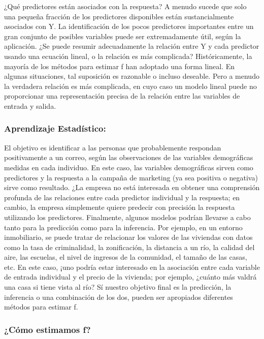 \documentclass[
  letterpaper,
  DIV=11,
  numbers=noendperiod]{scrartcl}
\begin{document}
¿Qué predictores están asociados con la respuesta? A menudo sucede que
solo una pequeña fracción de los predictores disponibles están
sustancialmente asociados con Y. La identificación de los pocos
predictores importantes entre un gran conjunto de posibles variables
puede ser extremadamente útil, según la aplicación. ¿Se puede resumir
adecuadamente la relación entre Y y cada predictor usando una ecuación
lineal, o la relación es más complicada? Históricamente, la mayoría de
los métodos para estimar f han adoptado una forma lineal. En algunas
situaciones, tal suposición es razonable o incluso deseable. Pero a
menudo la verdadera relación es más complicada, en cuyo caso un modelo
lineal puede no proporcionar una representación precisa de la relación
entre las variables de entrada y salida.

\hypertarget{aprendizaje-estaduxedstico}{%
\subsubsection{\texorpdfstring{\textbf{Aprendizaje
Estadístico:}}{Aprendizaje Estadístico:}}\label{aprendizaje-estaduxedstico}}

El objetivo es identificar a las personas que probablemente respondan
positivamente a un correo, según las observaciones de las variables
demográficas medidas en cada individuo. En este caso, las variables
demográficas sirven como predictores y la respuesta a la campaña de
marketing (ya sea positiva o negativa) sirve como resultado. ¿La empresa
no está interesada en obtener una comprensión profunda de las relaciones
entre cada predictor individual y la respuesta; en cambio, la empresa
simplemente quiere predecir con precisión la respuesta utilizando los
predictores. Finalmente, algunos modelos podrían llevarse a cabo tanto
para la predicción como para la inferencia. Por ejemplo, en un entorno
inmobiliario, se puede tratar de relacionar los valores de las viviendas
con datos como la tasa de criminalidad, la zonificación, la distancia a
un río, la calidad del aire, las escuelas, el nivel de ingresos de la
comunidad, el tamaño de las casas, etc. En este caso, ¡uno podría estar
interesado en la asociación entre cada variable de entrada individual y
el precio de la vivienda; por ejemplo, ¿cuánto más valdrá una casa si
tiene vista al río? Sí nuestro objetivo final es la predicción, la
inferencia o una combinación de los dos, pueden ser apropiados
diferentes métodos para estimar f.

\hypertarget{cuxf3mo-estimamos-f}{%
\subsubsection{\texorpdfstring{\textbf{¿Cómo estimamos
f?}}{¿Cómo estimamos f?}}\label{cuxf3mo-estimamos-f}}
\end{document}
